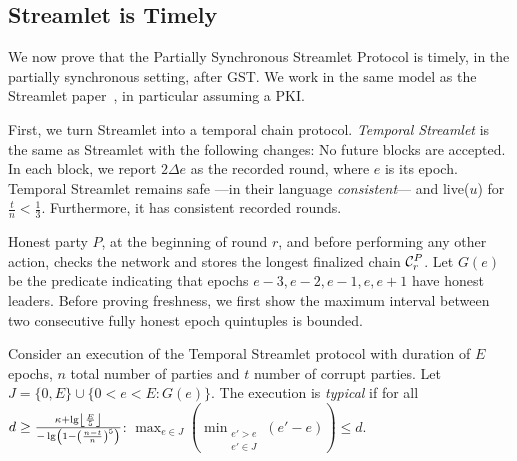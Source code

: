 \subsection{Streamlet is Timely}

We now prove that the Partially Synchronous Streamlet Protocol is timely,
in the partially synchronous setting, after GST.
We work in the same model as the Streamlet paper~\cite{streamlet},
in particular assuming a PKI.

First, we turn Streamlet into a temporal chain protocol.
\emph{Temporal Streamlet} is the same as Streamlet with the
following changes: No future blocks are accepted. In each block, we report
$2\Delta e$ as the recorded round, where $e$ is its epoch.
Temporal Streamlet remains safe ---in their language \emph{consistent}--- and live($u$)
for $\frac{t}{n} < \frac{1}{3}$. Furthermore, it has consistent recorded rounds.

Honest party $P$, at the beginning of round $r$, and
before performing any other action, checks the network and
stores the longest finalized chain $\chain^P_r$. 
Let $G(e)$ be the predicate indicating that epochs $e-3,e-2,e-1,e,e+1$ have honest leaders.
Before proving freshness, we first show the maximum interval between two consecutive fully
honest epoch quintuples is bounded.

\begin{definition}
  Consider an execution of the Temporal Streamlet protocol with duration
  of $E$ epochs, $n$ total number of parties and $t$ number of corrupt parties.
  Let $J = \{0,E\} \cup \{0 < e < E: G(e)\}$.
  The execution is \emph{typical} if for all
  $d \geq \frac{\kappa + \lg \floor*{\frac{E}{5}}}{- \lg \left(1 - \left(\frac{n - t}{n}\right)^5\right)}$:
  $\max_{e \in J}(\min_{\substack{e' > e \\ e' \in J}}(e' - e)) \leq d$.
\end{definition}

